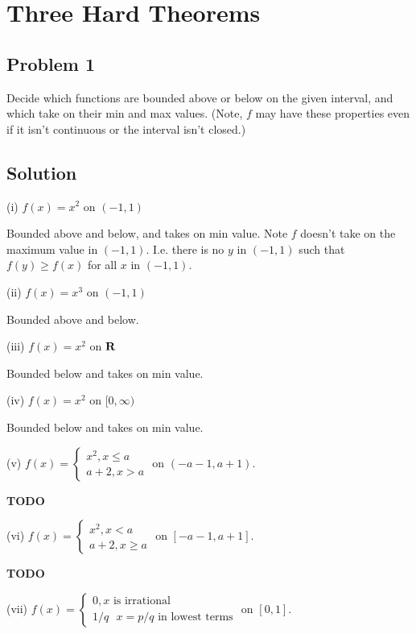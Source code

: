 \section{Three Hard Theorems}

\subsection*{Problem 1}
Decide which functions are bounded above or below on the given
interval, and which take on their min and max values. (Note, $f$ may
have these properties even if it isn't continuous or the interval
isn't closed.)

\subsection*{Solution}

(i) $f(x)=x^{2}$ on $(-1,1)$

Bounded above and below, and takes on min value. Note $f$ doesn't take
on the maximum value in $(-1,1)$. I.e. there is no $y$ in $(-1,1)$
such that $f(y)\geq f(x)$ for all $x$ in $(-1,1)$.

\vs

(ii) $f(x)=x^{3}$ on $(-1,1)$

Bounded above and below.

\vs

(iii) $f(x)=x^{2}$ on $\mathbf{R}$

Bounded below and takes on min value.

\vs

(iv) $f(x)=x^{2}$ on $[0, \infty)$

Bounded below and takes on min value.

\vs

(v) $f(x)=\begin{cases}
  x^{2}, x\leq a\\
  a+2, x>a
\end{cases}$ on $(-a-1, a+1)$.

\textbf{TODO}


\vs

(vi) $f(x)=\begin{cases}
  x^{2}, x<a\\
  a+2, x\geq a
\end{cases}$ on $[-a-1, a+1]$.

\textbf{TODO}

\vs

(vii) $f(x)=\begin{cases}
  0, \text{$x$ is irrational}\\
  1/q \ \ \ x=p/q \text{ in lowest terms}
\end{cases}$ on $[0, 1]$.

